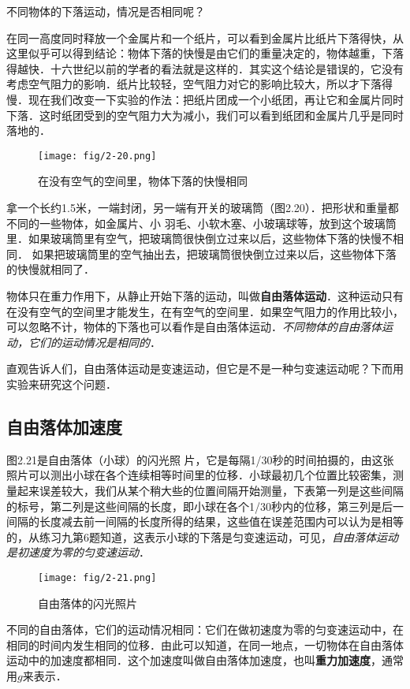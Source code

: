 不同物体的下落运动，情况是否相同呢？

在同一高度同时释放一个金属片和一个纸片，可以看到金属片比纸片下落得快，从这里似乎可以得到结论：物体下落的快慢是由它们的重量决定的，物体越重，下落得越快．十六世纪以前的学者的看法就是这样的．其实这个结论是错误的，它没有考虑空气阻力的影响．纸片比较轻，空气阻力对它的影响比较大，所以才下落得慢．现在我们改变一下实验的作法：把纸片团成一个小纸团，再让它和金属片同时下落．这时纸团受到的空气阻力大为减小，我们可以看到纸团和金属片几乎是同时落地的．
\begin{figure}[htp]
\centering
\texttt{[image: fig/2-20.png]}
\caption{在没有空气的空间里，物体下落的快慢相同}
\end{figure}

拿一个长约1.5米，一端封闭，另一端有开关的玻璃筒（图2.20）．把形状和重量都不同的一些物体，如金属片、小
羽毛、小软木塞、小玻璃球等，放到这个玻璃筒里．如果玻璃筒里有空气，把玻璃筒很快倒立过来以后，这些物体下落的快慢不相同．
如果把玻璃筒里的空气抽出去，把玻璃筒很快倒立过来以后，这些物体下落的快慢就相同了．



物体只在重力作用下，从静止开始下落的运动，叫做\textbf{自由落体运动}．这种运动只有在没有空气的空间里才能发生，在有空气的空间里．如果空气阻力的作用比较小，可以忽略不计，物体的下落也可以看作是自由落体运动．\textit{不同物体的自由落体运动，它们的运动情况是相同的}．

直观告诉人们，自由落体运动是变速运动，但它是不是一种匀变速运动呢？下而用实验来研究这个问题．


\subsection{自由落体加速度}
图2.21是自由落体（小球）的闪光照
片，它是每隔1/30秒的时间拍摄的，由这张照片可以测出小球在各个连续相等时间里的位移．小球最初几个位置比较密集，测量起来误差较大，我们从某个稍大些的位置间隔开始测量，下表第一列是这些间隔的标号，第二列是这些间隔的长度，即小球在各个1/30秒内的位移，第三列是后一间隔的长度减去前一间隔的长度所得的结果，这些值在误差范围内可以认为是相等的，从练习九第6题知道，这表示小球的下落是匀变速运动，可见，\textit{自由落体运动是初速度为零的匀变速运动}．

\begin{figure}[htp]
\centering
\texttt{[image: fig/2-21.png]}
\caption{自由落体的闪光照片}
\end{figure}

不同的自由落体，它们的运动情况相同：它们在做初速度为零的匀变速运动中，在相同的时间内发生相同的位移．由此可以知道，在同一地点，一切物体在自由落体运动中的加速度都相同．这个加速度叫做自由落体加速度，也叫\textbf{重力加速度}，通常用$g$来表示．

